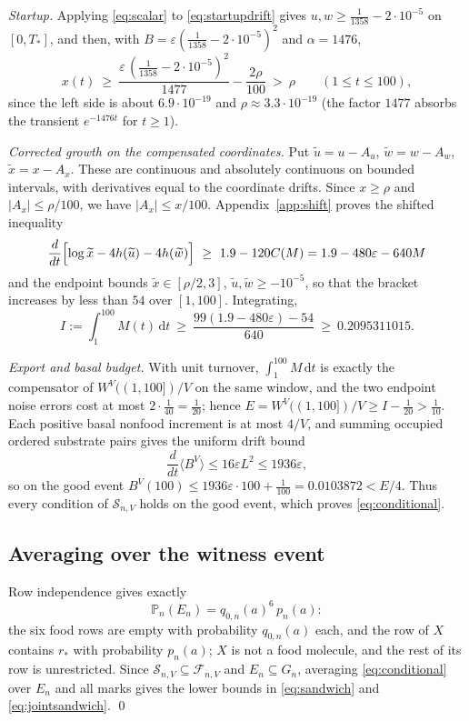\documentclass[11pt,letterpaper]{article}
\theoremstyle{plain}
\theoremstyle{definition}
\theoremstyle{remark}
\numberwithin{equation}{section}
\newcommand{\PP}{\mathbb P}
\newcommand{\cF}{\mathcal F}
\newcommand{\cS}{\mathcal S}
\newcommand{\eps}{\varepsilon}
\newcommand{\dd}{\,\mathrm dt}
\newcommand{\Bcoef}{B}
\begin{document}
\emph{Startup.} Applying \eqref{eq:scalar} to \eqref{eq:startupdrift} gives $u,w\ge\frac1{1358}-2\cdot10^{-5}$ on $[0,T_*]$, and then, with $\Bcoef=\eps(\frac1{1358}-2\cdot10^{-5})^2$ and $\alpha=1476$,
\[
 x(t)\ \ge\ \frac{\eps\,(\frac1{1358}-2\cdot10^{-5})^2}{1477}-\frac{2\rho}{100}\ >\ \rho\qquad(1\le t\le100),
\]
since the left side is about $6.9\cdot10^{-19}$ and $\rho\approx3.3\cdot10^{-19}$ (the factor $1477$ absorbs the transient $e^{-1476t}$ for $t\ge1$).

\emph{Corrected growth on the compensated coordinates.} Put $\widetilde u=u-A_u$, $\widetilde w=w-A_w$, $\widetilde x=x-A_x$. These are continuous and absolutely continuous on bounded intervals, with derivatives equal to the coordinate drifts. Since $x\ge\rho$ and $|A_x|\le\rho/100$, we have $|A_x|\le x/100$. Appendix~\ref{app:shift} proves the shifted inequality
\begin{equation}\label{eq:robust}
 \frac{d}{dt}\Bigl[\log\widetilde x-4h(\widetilde u)-4h(\widetilde w)\Bigr]\ \ge\ 1.9-120C(M)=1.9-480\eps-640M
\end{equation}
and the endpoint bounds $\widetilde x\in[\rho/2,3]$, $\widetilde u,\widetilde w\ge-10^{-5}$, so that the bracket increases by less than $54$ over $[1,100]$. Integrating,
\begin{equation}\label{eq:integral}
 I:=\int_1^{100}M(t)\dd\ \ge\ \frac{99(1.9-480\eps)-54}{640}\ \ge\ 0.2095311015 .
\end{equation}

\emph{Export and basal budget.} With unit turnover, $\int_1^{100}M\dd$ is exactly the compensator of $W^V((1,100])/V$ on the same window, and the two endpoint noise errors cost at most $2\cdot\frac1{40}=\frac1{20}$; hence $E=W^V((1,100])/V\ge I-\frac1{20}>\frac1{10}$. Each positive basal nonfood increment is at most $4/V$, and summing occupied ordered substrate pairs gives the uniform drift bound
\begin{equation}\label{eq:basal}
 \frac{d}{dt}\langle B^V\rangle\le16\eps L^2\le1936\eps ,
\end{equation}
so on the good event $B^V(100)\le1936\eps\cdot100+\frac1{100}=0.0103872<E/4$. Thus every condition of $\cS_{n,V}$ holds on the good event, which proves \eqref{eq:conditional}.

\subsection{Averaging over the witness event}
Row independence gives exactly
\begin{equation}\label{eq:Eprob}
 \PP_n(E_n)=q_{0,n}(a)^6\,p_n(a):
\end{equation}
the six food rows are empty with probability $q_{0,n}(a)$ each, and the row of $X$ contains $r_*$ with probability $p_n(a)$; $X$ is not a food molecule, and the rest of its row is unrestricted. Since $\cS_{n,V}\subseteq\cF_{n,V}$ and $E_n\subseteq G_n$, averaging \eqref{eq:conditional} over $E_n$ and all marks gives the lower bounds in \eqref{eq:sandwich} and \eqref{eq:jointsandwich}. \qed
\end{document}
